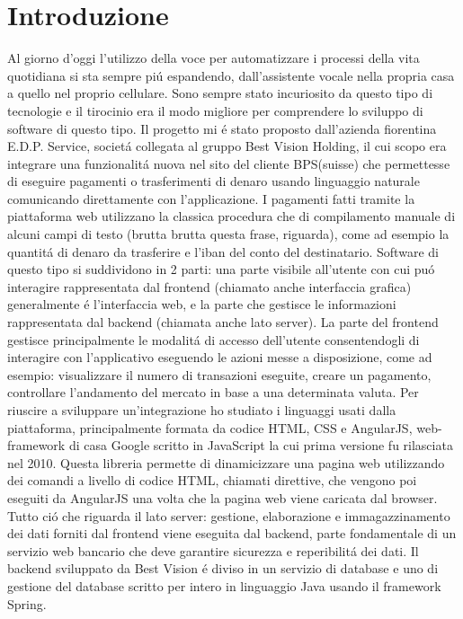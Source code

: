 \chapter{Introduzione}
Al giorno d'oggi l'utilizzo della voce per automatizzare i processi della vita quotidiana si sta sempre pi\'u espandendo, dall'assistente vocale nella propria casa a quello nel proprio cellulare. Sono sempre stato incuriosito da questo tipo di tecnologie e il tirocinio era il modo migliore per comprendere lo sviluppo di software di questo tipo. Il progetto mi \'e stato proposto dall'azienda fiorentina E.D.P. Service, societ\'a collegata al gruppo Best Vision Holding, il cui scopo era integrare una funzionalit\'a nuova nel sito del cliente BPS(suisse) che permettesse di eseguire pagamenti o trasferimenti di denaro usando linguaggio naturale comunicando direttamente con l'applicazione.
I pagamenti fatti tramite la piattaforma web utilizzano la classica procedura che di compilamento manuale di alcuni campi di testo (brutta brutta questa frase, riguarda), come ad esempio la quantit\'a di denaro da trasferire e l'iban del conto del destinatario.
Software di questo tipo si suddividono in 2 parti: una parte visibile all'utente con cui pu\'o interagire rappresentata dal frontend (chiamato anche interfaccia grafica) generalmente \'e l'interfaccia web, e la parte che gestisce le informazioni rappresentata dal backend (chiamata anche lato server).
La parte del frontend gestisce principalmente le modalit\'a di accesso dell'utente consentendogli di interagire con l'applicativo eseguendo le azioni messe a disposizione, come ad esempio: visualizzare il numero di transazioni eseguite, creare un pagamento, controllare l'andamento del mercato in base a una determinata valuta. 
Per riuscire a sviluppare un'integrazione ho studiato i linguaggi usati dalla piattaforma, principalmente formata da codice HTML, CSS e AngularJS, web-framework di casa Google scritto in JavaScript la cui prima versione fu rilasciata nel 2010. Questa libreria permette di dinamicizzare una pagina web utilizzando dei comandi a livello di codice HTML, chiamati direttive, che vengono poi eseguiti da AngularJS una volta che la pagina web viene caricata dal browser.
Tutto ci\'o che riguarda il lato server: gestione, elaborazione e immagazzinamento dei dati forniti dal frontend viene eseguita dal backend, parte fondamentale di un servizio web bancario che deve garantire sicurezza e reperibilit\'a dei dati. Il backend sviluppato da Best Vision \'e diviso in un servizio di database e uno di gestione del database scritto per intero in linguaggio Java usando il framework Spring. 
